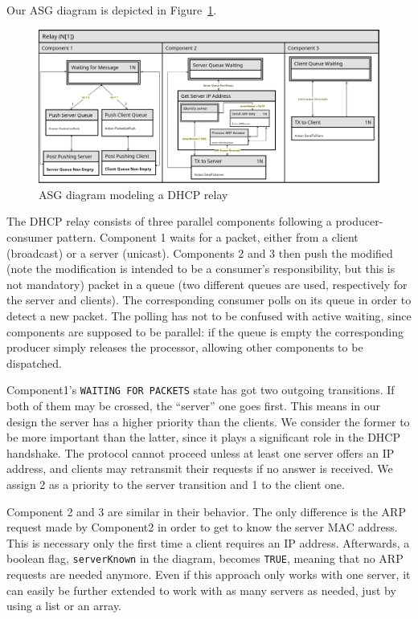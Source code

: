 Our ASG diagram is depicted in Figure~\ref{fig:asg}.

\begin{figure}[h]
	\centerline{\includegraphics[width=1.15\textwidth]{images/asg-diagram}}
	\caption{ASG diagram modeling a DHCP relay}
	\label{fig:asg}
\end{figure}

The DHCP relay consists of three parallel components following a producer-consumer pattern. Component 1 waits for a packet, either from a client (broadcast) or a server (unicast). Components 2 and 3 then push the modified (note the modification is intended to be a consumer's responsibility, but this is not mandatory) packet in a queue (two different queues are used, respectively for the server and clients). The corresponding consumer polls on its queue in order to detect a new packet. The polling has not to be confused with active waiting, since components are supposed to be parallel: if the queue is empty the corresponding producer simply releases the processor, allowing other components to be dispatched.

Component1's \texttt{WAITING FOR PACKETS} state has got two outgoing transitions. If both of them may be crossed, the ``server'' one goes first. This means in our design the server has a higher priority than the clients. We consider the former to be more important than the latter, since it plays a significant role in the DHCP handshake. The protocol cannot proceed unless at least one server offers an IP address, and clients may retransmit their requests if no answer is received. We assign 2 as a priority to the server transition and 1 to the client one.

Component 2 and 3 are similar in their behavior. The only difference is the ARP request made by Component2 in order to get to know the server MAC address. This is necessary only the first time a client requires an IP address. Afterwards, a boolean flag, \texttt{serverKnown} in the diagram, becomes \texttt{TRUE}, meaning that no ARP requests are needed anymore. Even if this approach only works with one server, it can easily be further extended to work with as many servers as needed, just by using a list or an array.

